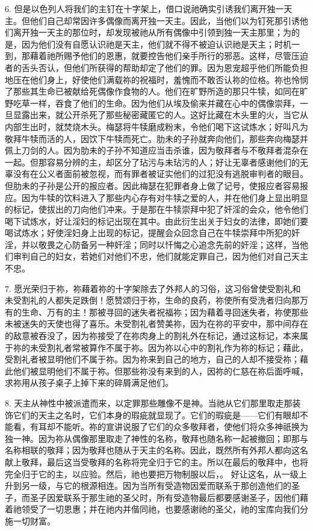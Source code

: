 6. 但是以色列人将我们的主钉在十字架上，借口说祂确实引诱我们离开独一天主。但他们自己却常因许多偶像而离开独一天主。因此，当他们以为钉死那引诱他们离开独一天主的那位时，却发现被祂从所有偶像中引领到独一天主那里；为的是，因为他们没有自愿认识祂是天主，他们就不得不被迫认识祂是天主；时机一到，那藉着祂所赐予他们的恩惠，就要控告他们亲手所行的邪恶。这样，尽管压迫者的舌头否认，但他们所获得的帮助却定了他们的罪。因为恩宠超乎他们所能负担地压在他们身上，好使他们满载祢的祝福时，羞愧而不敢否认祢的位格。祢也怜悯了那些其生命已被献给死偶像作食物的人。他们在旷野所造的那只牛犊，如同在旷野吃草一样，吞食了他们的生命。因为他们从埃及偷来并藏在心中的偶像崇拜，一旦显露出来，就公开杀死了那些秘密藏匿它的人。这好比藏在木头里的火，当它从内部生出时，就焚烧木头。梅瑟将牛犊磨成粉末，令他们喝下这试炼水；好叫凡为敬拜牛犊而活的人，因饮下牛犊而死亡。肋未的子孙就奔向他们，那些奔向梅瑟并佩上刀剑的人。因为肋未的子孙不知道应当击杀谁，因为敬拜者与不敬拜者混杂在一起。但那容易分辨的主，却区分了玷污与未玷污的人；好让无辜者感谢他们的无辜没有在公义者面前被忽视，而有罪者被证实他们的过犯没有逃脱审判者的眼目。但肋未的子孙是公开的报应者。因此梅瑟在犯罪者身上做了记号，使报应者容易报应。因为牛犊的饮料进入了那些内心存有对牛犊之爱的人，并在他们身上显出明显的标记，使拔出的刀向他们冲来。于是那在牛犊崇拜中犯了奸淫的会众，他令他们喝下试炼水，好让淫妇的标记出现在其中。由此衍生出关于妇女的法律，即她们要喝试炼水；好使淫妇身上出现的标记，提醒会众回念自己在牛犊崇拜中所犯的奸淫，并以敬畏之心防备另一种奸淫；同时以忏悔之心追念先前的奸淫；这样，当他们审判自己的妇女，若她们对他们不忠，他们就能定罪自己，因为他们对自己天主不忠。\par

7. 愿光荣归于祢，祢藉着祢的十字架除去了外邦人的习俗，这习俗曾使受割礼和未受割礼的人都失足跌倒！愿赞颂归于祢，生命的良药，祢使所有受洗者归向那万有的生命、万有的主！那被寻回的迷失者祝福祢；因为藉着寻回迷失者，祢使那些未被迷失的天使也得了喜乐。未受割礼者赞美祢，因为在祢的平安中，那中间存在的敌意被吞没了，因为祢接受了在祢肉身上的割礼外在标记，通过这标记，本来属于祢的未受割礼者常被算作不属于祢。因为祢以心中的割礼作为祢的标记；藉此，受割礼者被显明他们不属于祢。因为祢来到自己的地方，自己的人却不接受祢；藉此他们被显明他们不属于祢。但那些祢没有来到的人，因祢的仁慈在祢后面呼喊，求祢用从孩子桌子上掉下来的碎屑满足他们。\par

8. 天主从神性中被派遣而来，以定罪那些雕像不是神。当祂从它们那里取走那装饰它们的天主之名时，它们本身的瑕疵就显现了。它们的瑕疵是——它们有眼却不能看，有耳却不能听。祢的宣讲说服了它们的众多敬拜者，使他们将众多神祇换为独一神。因为祢从偶像那里取走了神性的名称，敬拜也随名称一起被撤回；即那与名称相联的敬拜；因为敬拜也随从于天主的名称。因此，既然所有外邦人都向这名献上敬拜，最后这当受敬拜的名称将完全归于它的主。所以在最后的敬拜中，也将完全归于它的主，以应验。然后，祂也要把万物制服以后，。 好让这名，从一级上升到另一级，与它的根源相连。因为当所有受造物因爱而联系于那创造他们的圣子，而圣子因爱联系于那生祂的圣父时，所有受造物最后都要感谢圣子，因他们藉着祂领受了一切恩惠；并在祂内并偕同祂，也要感谢祂的圣父，祂的宝库向我们分施一切财富。\par

